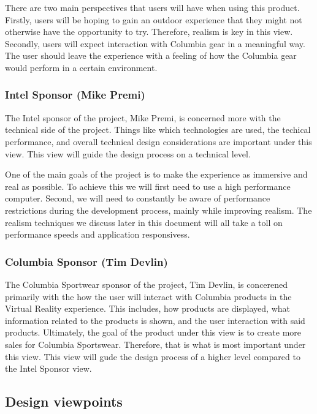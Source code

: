 \documentclass[10pt,journal,compsoc,onecolumn, draftclsnofoot]{IEEEtran}
\begin{document}
There are two main perspectives that users will have when using this product.
Firstly, users will be hoping to gain an outdoor experience that they might not otherwise have the opportunity to try. Therefore, realism is key in this view.
Secondly, users will expect interaction with Columbia gear in a meaningful way.
The user should leave the experience with a feeling of how the Columbia gear would perform in a certain environment.


\subsubsection{Intel Sponsor (Mike Premi)}
The Intel sponsor of the project, Mike Premi, is concerned more with the technical side of the project.
Things like which technologies are used, the techical performance, and overall technical design considerations are important under this view.
This view will guide the design process on a technical level.

One of the main goals of the project is to make the experience as immersive and real as possible. To achieve this we will first need to use a high performance computer. Second, we will need to constantly be aware of performance restrictions during the development process, mainly while improving realism. The realism techniques we discuss later in this document will all take a toll on performance speeds and application responsivess.

\subsubsection{Columbia Sponsor (Tim Devlin)}
The Columbia Sportwear sponsor of the project, Tim Devlin, is concerened primarily with the how the user will interact with Columbia products in the Virtual Reality experience.
This includes, how products are displayed, what information related to the products is shown, and the user interaction with said products.
Ultimately, the goal of the product under this view is to create more sales for Columbia Sportswear.
Therefore, that is what is most important under this view.
This view will gude the design process of a higher level compared to the Intel Sponsor view.

\subsection{Design viewpoints}
\end{document}
